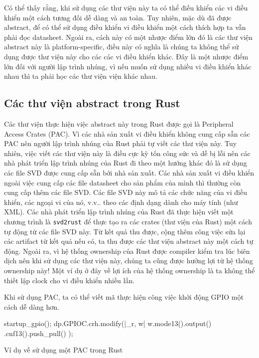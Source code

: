 Có thể thấy rằng, khi sử dụng các thư viện này ta có thể điều khiển các vi điều khiển một cách tương đối dễ dàng và an toàn.
Tuy nhiên, mặc dù đã được abstract, để có thể sử dụng điều khiển vi điều khiển một cách thích hợp ta vẫn phải đọc datasheet.
Ngoài ra, cách này có một nhược điểm lớn đó là các thư viện abstract này là platform-specific, điều này có nghĩa là chúng ta không thể sử dụng được thư viện này cho các các vi điều khiển khác.
Đây là một nhược điểm lớn đối với người lập trình nhúng, vì nếu muốn sử dụng nhiều vi điều khiển khác nhau thì ta phải học các thư viện viện khác nhau.

\subsection{Các thư viện abstract trong Rust}
Các thư viện thực hiện việc abstract này trong Rust được gọi là Peripheral Access Crates (PAC).
Vì các nhà sản xuất vi điều khiển không cung cấp sẵn các PAC nên người lập trình nhúng của Rust phải tự viết các thư viện này.
Tuy nhiên, việc viết các thư viện này là điều cực kỳ tốn công sức và dễ bị lỗi nên các nhà phát triển lập trình nhúng của Rust đi theo một hướng khác đó là sử dụng các file SVD được cung cấp sẵn bởi nhà sản xuất.
Các nhà sản xuất vi điều khiển ngoài việc cung cấp các file datasheet cho sản phẩm của mình thì thường còn cung cấp thêm các file SVD.
Các file SVD này mô tả các chức năng của vi điều khiển, các ngoại vi của nó, v.v.. theo các định dạng dành cho máy tính (như XML).
Các nhà phát triển lập trình nhúng của Rust đã thực hiện viết một chương trình là \texttt{svd2rust} để thực tạo ra các crates (thư viện của Rust) một cách tự động từ các file SVD này.
Từ kết quả thu được, cộng thêm công việc sửa lại các artifact từ kết quả nếu có,
ta thu được các thư viện abstract này một cách tự động.
Ngoài ra, vì hệ thống ownership của Rust được compiler kiểm tra lúc biên dịch nên khi sử dụng các thư viện này, chúng ta cũng được hưởng lợi từ hệ thống ownership này!
Một ví dụ ở đây về lợi ích của hệ thống ownership là ta không thể thiết lập clock cho vi điều khiển nhiều lần.

Khi sử dụng PAC, ta có thể viết mã thực hiện công việc khởi động GPIO một cách dễ dàng hơn.
\begin{listing}[ht]
\begin{rustcode}
startup_gpio();
dp.GPIOC.crh.modify(|_r, w| {
    w.mode13().output()
     .cnf13().push_pull()
});
\end{rustcode}
\caption{Ví dụ về sử dụng một PAC trong Rust}
\end{listing}

